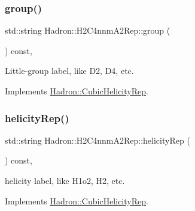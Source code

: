 \mbox{\label{structHadron_1_1H2C4nnmA2Rep_a5a67d986be4ac8ac591051bea3159855}} 
\subsubsection{\texorpdfstring{group()}{group()}\hspace{0.1cm}{\footnotesize\ttfamily [5/5]}}
{\footnotesize\ttfamily std\+::string Hadron\+::\+H2\+C4nnm\+A2\+Rep\+::group (\begin{DoxyParamCaption}{ }\end{DoxyParamCaption}) const\hspace{0.3cm}{\ttfamily [inline]}, {\ttfamily [virtual]}}

Little-\/group label, like D2, D4, etc. 

Implements \mbox{\hyperlink{structHadron_1_1CubicHelicityRep_a101a7d76cd8ccdad0f272db44b766113}{Hadron\+::\+Cubic\+Helicity\+Rep}}.

\mbox{\label{structHadron_1_1H2C4nnmA2Rep_a6f9741481d738e4bf6b7b5f035dac13c}} 
\subsubsection{\texorpdfstring{helicityRep()}{helicityRep()}\hspace{0.1cm}{\footnotesize\ttfamily [1/3]}}
{\footnotesize\ttfamily std\+::string Hadron\+::\+H2\+C4nnm\+A2\+Rep\+::helicity\+Rep (\begin{DoxyParamCaption}{ }\end{DoxyParamCaption}) const\hspace{0.3cm}{\ttfamily [inline]}, {\ttfamily [virtual]}}

helicity label, like H1o2, H2, etc. 

Implements \mbox{\hyperlink{structHadron_1_1CubicHelicityRep_af1096946b7470edf0a55451cc662f231}{Hadron\+::\+Cubic\+Helicity\+Rep}}.

\mbox{\label{structHadron_1_1H2C4nnmA2Rep_a6f9741481d738e4bf6b7b5f035dac13c}} 
